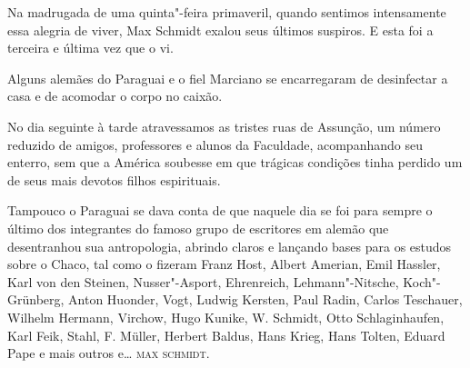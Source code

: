 Na madrugada de uma quinta"-feira primaveril, quando sentimos
intensamente essa alegria de viver, Max Schmidt exalou seus últimos
suspiros. E esta foi a terceira e última vez que o vi.

Alguns alemães do Paraguai e o fiel Marciano se encarregaram de
desinfectar a casa e de acomodar o corpo no caixão.

No dia seguinte à tarde atravessamos as tristes ruas de Assunção, um
número reduzido de amigos, professores e alunos da Faculdade,
acompanhando seu enterro, sem que a América soubesse em que trágicas
condições tinha perdido um de seus mais devotos filhos espirituais.

Tampouco o Paraguai se dava conta de que naquele dia se foi para sempre
o último dos integrantes do famoso grupo de escritores em alemão que
desentranhou sua antropologia, abrindo claros e lançando bases para os
estudos sobre o Chaco, tal como o fizeram Franz Host, Albert Amerian,
Emil Hassler, Karl von den Steinen, Nusser"-Asport, Ehrenreich,
Lehmann"-Nitsche, Koch"-Grünberg, Anton Huonder, Vogt, Ludwig Kersten,
Paul Radin, Carlos Teschauer, Wilhelm Hermann, Virchow, Hugo Kunike, W.
Schmidt, Otto Schlaginhaufen, Karl Feik, Stahl, F. Müller, Herbert
Baldus, Hans Krieg, Hans Tolten, Eduard Pape e mais outros e\ldots{} \textsc{max
schmidt}.

